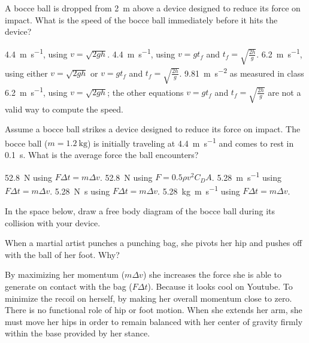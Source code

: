 \documentclass[exam,addpoints, noanswers]{exam}
\begin{document}
\begin{questions}
\clearpage
\question[5] A bocce ball is dropped from \SI{2}{\meter} above a device designed to reduce its force on impact. What is the speed of the bocce ball immediately before it hits the device? 
\begin{choices}
\choice \SI{4.4}{\meter\per\second}, using $v=\sqrt{2 g h}$. 
\choice \SI{4.4}{\meter\per\second}, using $v=g t_f$ and $t_f=\sqrt{\frac{2 h}{g}}$. 
\CorrectChoice \SI{6.2}{\meter\per\second}, using either $v=\sqrt{2 g h}$ or $v=g t_f$ and $t_f=\sqrt{\frac{2 h}{g}}$. 
\choice \SI{9.81}{\meter\per\second\squared} as measured in class
\choice \SI{6.2}{\meter\per\second}, using $v=\sqrt{2 g h}$; the other equations $v=g t_f$ and $t_f=\sqrt{\frac{2 h}{g}}$ are not a valid way to compute the speed. 
\end{choices}

\question[5] Assume a bocce ball strikes a device designed to reduce its force on impact. The bocce ball ($m=\SI{1.2}{\kilo\gram}$) is initially traveling at \SI{4.4}{\meter\per\second} and comes to rest in \SI{0.1}{\second}. What is the average force the ball encounters? 
\begin{choices}
\CorrectChoice \SI{52.8}{\newton} using $F \Delta t = m \Delta v$. 
\choice \SI{52.8}{\newton} using $F = 0.5 \rho v^2 C_D A$. 
\choice \SI{5.28}{\meter\per\second} using $F \Delta t = m \Delta v$. 
\choice \SI{5.28}{\newton\second} using $F \Delta t = m \Delta v$. 
\choice \SI{5.28}{\kilo\gram\meter\per\second} using $F \Delta t = m \Delta v$. 
\end{choices}

\question[5] In the space below, draw a free body diagram of the bocce ball during its collision with your device.
\begin{solution}[2in]
\end{solution}

\question[5] When a martial artist punches a punching bag, she pivots her hip and pushes off with the ball of her foot. Why?
\begin{choices}
\CorrectChoice By maximizing her momentum ($m\Delta v$) she increases the force she is able to generate on contact with the bag ($F\Delta t$). 
\choice Because it looks cool on Youtube. 
\choice To minimize the recoil on herself, by making her overall momentum close to zero. 
\choice There is no functional role of hip or foot motion. 
\choice When she extends her arm, she must move her hips in order to remain balanced with her center of gravity firmly within the base provided by her stance. 
\end{choices}




\end{questions}
\end{document}
